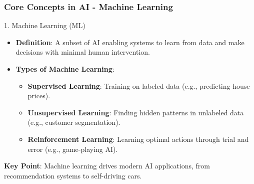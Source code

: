 \documentclass[aspectratio=169]{beamer}
\begin{document}
\begin{frame}[fragile]
    \frametitle{Core Concepts in AI - Machine Learning}
    \begin{block}{1. Machine Learning (ML)}
        \begin{itemize}
            \item \textbf{Definition}: A subset of AI enabling systems to learn from data and make decisions with minimal human intervention.
            \item \textbf{Types of Machine Learning}:
                \begin{itemize}
                    \item \textbf{Supervised Learning}: Training on labeled data (e.g., predicting house prices).
                    \item \textbf{Unsupervised Learning}: Finding hidden patterns in unlabeled data (e.g., customer segmentation).
                    \item \textbf{Reinforcement Learning}: Learning optimal actions through trial and error (e.g., game-playing AI).
                \end{itemize}
        \end{itemize}
        
        \textbf{Key Point}: Machine learning drives modern AI applications, from recommendation systems to self-driving cars.
    \end{block}
\end{frame}
\end{document}
